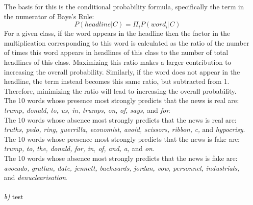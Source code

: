 \documentclass{article}
\theoremstyle{mytheor}
\theoremstyle{definition}
\begin{document}
The basis for this is the conditional probability formula, specifically the term in the numerator of Baye's Rule:
$$P(headline|C)=\Pi_{i}P(word_i|C)$$
For a given class, if the word appears in the headline then the factor in the multiplication corresponding to this word is calculated as the ratio of the number of times this word appears in headlines of this class to the number of total headlines of this class. Maximizing this ratio makes a larger contribution to increasing the overall probability. Similarly, if the word does not appear in the headline, the term instead becomes this same ratio, but subtracted from 1. Therefore, minimizing the ratio will lead to increasing the overall probability.\\

The 10 words whose presence most strongly predicts that the news is real are: \textit{trump, donald, to, us, in, trumps, on, of, says,} and \textit{for}.\\

The 10 words whose absence most strongly predicts that the news is real are: \textit{truths, pedo, ring, guerrilla, economist, avoid, scissors, ribbon, c,} and \textit{hypocrisy}.\\

The 10 words whose presence most strongly predicts that the news is fake are: \textit{trump, to, the, donald, for, in, of, and, a,} and \textit{on}.\\

The 10 words whose absence most strongly predicts that the news is fake are: \textit{avocado, grattan, date, jennett, backwards, jordan, vow, personnel, industrials,} and \textit{denuclearisation}.\\\\
\textit{b)} test
\end{document}
